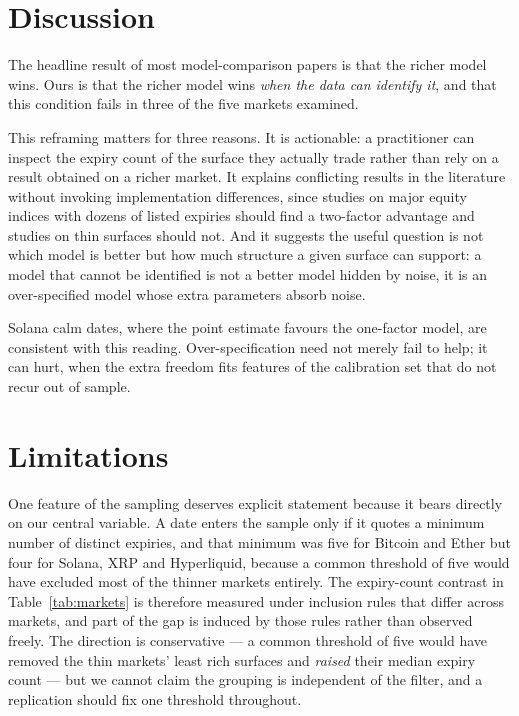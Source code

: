 \documentclass[runningheads]{llncs}
\begin{document}
\section{Discussion}

The headline result of most model-comparison papers is that the richer model
wins. Ours is that the richer model wins \emph{when the data can identify it},
and that this condition fails in three of the five markets examined.

This reframing matters for three reasons. It is actionable: a practitioner
can inspect the expiry count of the surface they actually trade rather than
rely on a result obtained on a richer market. It explains conflicting results
in the literature without invoking implementation differences, since studies
on major equity indices with dozens of listed expiries should find a
two-factor advantage and studies on thin surfaces should not. And it suggests
the useful question is not which model is better but how much structure a
given surface can support: a model that cannot be identified is not a better
model hidden by noise, it is an over-specified model whose extra parameters
absorb noise.

Solana calm dates, where the point estimate favours the one-factor model, are
consistent with this reading. Over-specification need not merely fail to help;
it can hurt, when the extra freedom fits features of the calibration set that
do not recur out of sample.

\section{Limitations}
\label{sec:limitations}

One feature of the sampling deserves explicit statement because it bears
directly on our central variable. A date enters the sample only if it quotes a
minimum number of distinct expiries, and that minimum was five for Bitcoin and
Ether but four for Solana, XRP and Hyperliquid, because a common threshold of
five would have excluded most of the thinner markets entirely. The
expiry-count contrast in Table~\ref{tab:markets} is therefore measured under
inclusion rules that differ across markets, and part of the gap is induced by
those rules rather than observed freely. The direction is conservative --- a
common threshold of five would have removed the thin markets' least rich
surfaces and \emph{raised} their median expiry count --- but we cannot claim
the grouping is independent of the filter, and a replication should fix one
threshold throughout.
\end{document}
